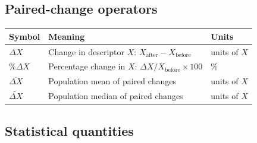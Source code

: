 \subsection*{\color{gsvblue}Paired-change operators}

{\small
\renewcommand{\arraystretch}{1.12}
\begin{tabular}{@{}p{}p{}p{}@{}}
\toprule
\rowcolor{tablehdr}
{\color{white}\textbf{Symbol}} & {\color{white}\textbf{Meaning}} & {\color{white}\textbf{Units}}\\
\midrule
$\Delta X$     & Change in descriptor $X$:
                 $X_{\text{after}} - X_{\text{before}}$                & units of $X$ \\
$\%\Delta X$   & Percentage change in $X$:
                 $\Delta X / X_{\text{before}} \times 100$             & \si{\percent} \\
$\overline{\Delta X}$ & Population mean of paired changes              & units of $X$ \\
$\widetilde{\Delta X}$ & Population median of paired changes           & units of $X$ \\
\bottomrule
\end{tabular}}

\vspace{0.7em}

\subsection*{\color{gsvblue}Statistical quantities}

